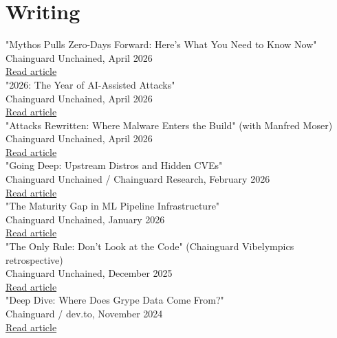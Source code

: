 \documentclass[11pt]{article}
\begin{document}
\section*{Writing}
\label{sec:org83297a8}
"Mythos Pulls Zero-Days Forward: Here's What You Need to Know Now"\\[0pt]
Chainguard Unchained, April 2026\\[0pt]
\href{https://www.chainguard.dev/unchained/mythos-pulls-zero-days-forward-heres-what-you-need-to-know-now}{Read article}\\[0pt]

"2026: The Year of AI-Assisted Attacks"\\[0pt]
Chainguard Unchained, April 2026\\[0pt]
\href{https://www.chainguard.dev/unchained/2026-the-year-of-ai-assisted-attacks}{Read article}\\[0pt]

"Attacks Rewritten: Where Malware Enters the Build" (with Manfred Moser)\\[0pt]
Chainguard Unchained, April 2026\\[0pt]
\href{https://www.chainguard.dev/unchained/attacks-rewritten-where-malware-enters-the-build}{Read article}\\[0pt]

"Going Deep: Upstream Distros and Hidden CVEs"\\[0pt]
Chainguard Unchained / Chainguard Research, February 2026\\[0pt]
\href{https://www.chainguard.dev/unchained/going-deep-upstream-distros-and-hidden-cves}{Read article}\\[0pt]

"The Maturity Gap in ML Pipeline Infrastructure"\\[0pt]
Chainguard Unchained, January 2026\\[0pt]
\href{https://www.chainguard.dev/unchained/the-maturity-gap-in-ml-pipeline-infrastructure}{Read article}\\[0pt]

"The Only Rule: Don't Look at the Code" (Chainguard Vibelympics retrospective)\\[0pt]
Chainguard Unchained, December 2025\\[0pt]
\href{https://www.chainguard.dev/unchained/the-only-rule-dont-look-at-the-code}{Read article}\\[0pt]

"Deep Dive: Where Does Grype Data Come From?"\\[0pt]
Chainguard / dev.to, November 2024\\[0pt]
\href{https://dev.to/chainguard/deep-dive-where-does-grype-data-come-from-n9e}{Read article}\\[0pt]
\end{document}
